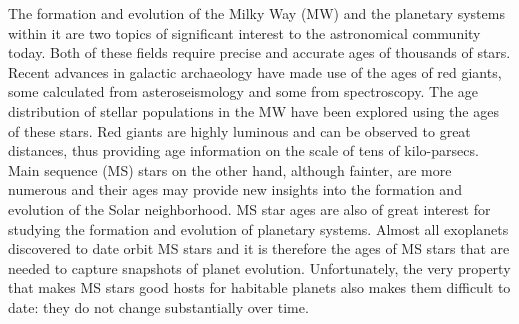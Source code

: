 
The formation and evolution of the Milky Way (MW) and the planetary systems
within it are two topics of significant interest to the astronomical community
today.
Both of these fields require precise and accurate ages of thousands of stars.
Recent advances in galactic archaeology have made use of the ages of red
giants, some calculated from asteroseismology and some from spectroscopy.
The age distribution of stellar populations in the MW have been explored using
the ages of these stars.
Red giants are highly luminous and can be observed to great distances, thus
providing age information on the scale of tens of kilo-parsecs.
Main sequence (MS) stars on the other hand, although fainter, are more
numerous and their ages may provide new insights into the formation and
evolution of the Solar neighborhood.
MS star ages are also of great interest for studying the formation and
evolution of planetary systems.
Almost all exoplanets discovered to date orbit MS stars and it is therefore
the ages of MS stars that are needed to capture snapshots of planet evolution.
Unfortunately, the very property that makes MS stars good hosts for habitable
planets also makes them difficult to date: they do not change substantially
over time.

